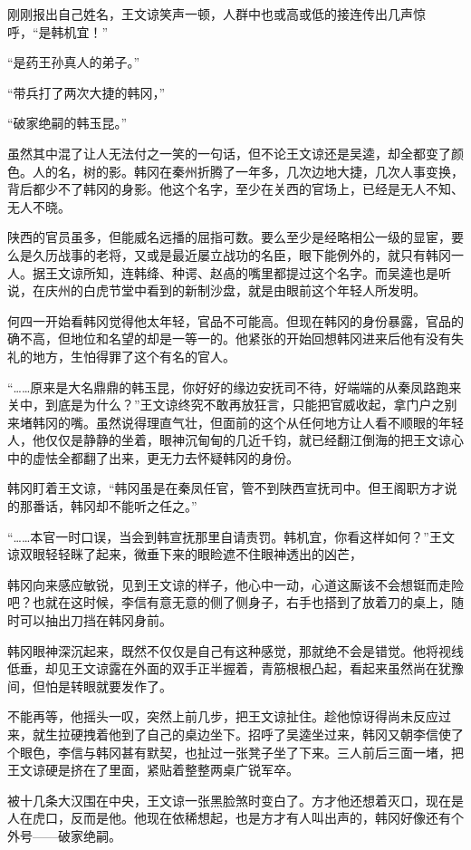 刚刚报出自己姓名，王文谅笑声一顿，人群中也或高或低的接连传出几声惊呼，“是韩机宜！”

“是药王孙真人的弟子。”

“带兵打了两次大捷的韩冈，”

“破家绝嗣的韩玉昆。”

虽然其中混了让人无法付之一笑的一句话，但不论王文谅还是吴逵，却全都变了颜色。人的名，树的影。韩冈在秦州折腾了一年多，几次边地大捷，几次人事变换，背后都少不了韩冈的身影。他这个名字，至少在关西的官场上，已经是无人不知、无人不晓。

陕西的官员虽多，但能威名远播的屈指可数。要么至少是经略相公一级的显宦，要么是久历战事的老将，又或是最近屡立战功的名臣，眼下能例外的，就只有韩冈一人。据王文谅所知，连韩绛、种谔、赵卨的嘴里都提过这个名字。而吴逵也是听说，在庆州的白虎节堂中看到的新制沙盘，就是由眼前这个年轻人所发明。

何四一开始看韩冈觉得他太年轻，官品不可能高。但现在韩冈的身份暴露，官品的确不高，但地位和名望的却是一等一的。他紧张的开始回想韩冈进来后他有没有失礼的地方，生怕得罪了这个有名的官人。

“……原来是大名鼎鼎的韩玉昆，你好好的缘边安抚司不待，好端端的从秦凤路跑来关中，到底是为什么？”王文谅终究不敢再放狂言，只能把官威收起，拿门户之别来堵韩冈的嘴。虽然说得理直气壮，但面前的这个从任何地方让人看不顺眼的年轻人，他仅仅是静静的坐着，眼神沉甸甸的几近千钧，就已经翻江倒海的把王文谅心中的虚怯全都翻了出来，更无力去怀疑韩冈的身份。

韩冈盯着王文谅，“韩冈虽是在秦凤任官，管不到陕西宣抚司中。但王阁职方才说的那番话，韩冈却不能听之任之。”

“……本官一时口误，当会到韩宣抚那里自请责罚。韩机宜，你看这样如何？”王文谅双眼轻轻眯了起来，微垂下来的眼睑遮不住眼神透出的凶芒，

韩冈向来感应敏锐，见到王文谅的样子，他心中一动，心道这厮该不会想铤而走险吧？也就在这时候，李信有意无意的侧了侧身子，右手也搭到了放着刀的桌上，随时可以抽出刀挡在韩冈身前。

韩冈眼神深沉起来，既然不仅仅是自己有这种感觉，那就绝不会是错觉。他将视线低垂，却见王文谅露在外面的双手正半握着，青筋根根凸起，看起来虽然尚在犹豫间，但怕是转眼就要发作了。

不能再等，他摇头一叹，突然上前几步，把王文谅扯住。趁他惊讶得尚未反应过来，就生拉硬拽着他到了自己的桌边坐下。招呼了吴逵坐过来，韩冈又朝李信使了个眼色，李信与韩冈甚有默契，也扯过一张凳子坐了下来。三人前后三面一堵，把王文谅硬是挤在了里面，紧贴着整整两桌广锐军卒。

被十几条大汉围在中央，王文谅一张黑脸煞时变白了。方才他还想着灭口，现在是人在虎口，反而是他。他现在依稀想起，也是方才有人叫出声的，韩冈好像还有个外号——破家绝嗣。

